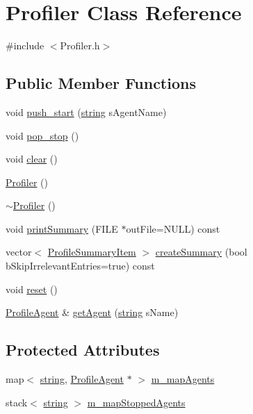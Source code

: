 \hypertarget{class_profiler}{}\section{Profiler Class Reference}
\label{class_profiler}


{\ttfamily \#include $<$Profiler.\+h$>$}

\subsection*{Public Member Functions}
\begin{DoxyCompactItemize}
\item 
void \hyperlink{class_profiler_aad319c9a5c095ccce87c4e9f90c4dd15}{push\+\_\+start} (\hyperlink{testfpzip_8cpp_a984bb8e04129c4268bd6ff36a50c9fa4}{string} s\+Agent\+Name)
\item 
void \hyperlink{class_profiler_aed892ccd9527b4bf54af37621e1c913d}{pop\+\_\+stop} ()
\item 
void \hyperlink{class_profiler_a69efd6617fa713b02fbe953d8c16e4db}{clear} ()
\item 
\hyperlink{class_profiler_a675ebc9207b9aeace1d967c085abeacf}{Profiler} ()
\item 
\hyperlink{class_profiler_a1e6dd8f6cfb15cd5237b971d8f49c749}{$\sim$\+Profiler} ()
\item 
void \hyperlink{class_profiler_a5a95baf5d5339da6e871d84f6122a1ef}{print\+Summary} (F\+I\+L\+E $\ast$out\+File=N\+U\+L\+L) const 
\item 
vector$<$ \hyperlink{struct_profile_summary_item}{Profile\+Summary\+Item} $>$ \hyperlink{class_profiler_a3a9331ea2bf3d331a39c1c281a84c093}{create\+Summary} (bool b\+Skip\+Irrelevant\+Entries=true) const 
\item 
void \hyperlink{class_profiler_a1f2fdbd66925222007a1461ecd4d01f9}{reset} ()
\item 
\hyperlink{class_profile_agent}{Profile\+Agent} \& \hyperlink{class_profiler_a31b511654f7addcef16776092ab6cdf0}{get\+Agent} (\hyperlink{testfpzip_8cpp_a984bb8e04129c4268bd6ff36a50c9fa4}{string} s\+Name)
\end{DoxyCompactItemize}
\subsection*{Protected Attributes}
\begin{DoxyCompactItemize}
\item 
map$<$ \hyperlink{testfpzip_8cpp_a984bb8e04129c4268bd6ff36a50c9fa4}{string}, \hyperlink{class_profile_agent}{Profile\+Agent} $\ast$ $>$ \hyperlink{class_profiler_a289df33e2c71075ff9bf2d2c3e180c02}{m\+\_\+map\+Agents}
\item 
stack$<$ \hyperlink{testfpzip_8cpp_a984bb8e04129c4268bd6ff36a50c9fa4}{string} $>$ \hyperlink{class_profiler_a898eec43a1f9c8ed482d169e90f4a7bd}{m\+\_\+map\+Stopped\+Agents}
\end{DoxyCompactItemize}
